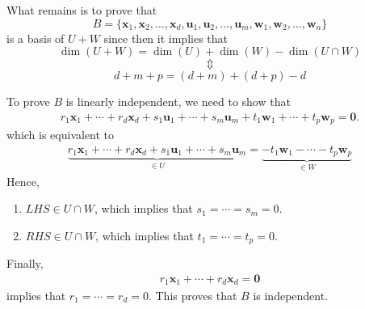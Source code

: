 \documentclass[pdf,9pt]{beamer}
\begin{document}
\begin{frame}[fragile]
    \begin{proofnoend}[continued]
	What remains is to prove that
	\[ B=\{ \bm{x}_1, \bm{x}_2, \ldots, \bm{x}_d,
		\bm{u}_1, \bm{u}_2, \ldots, \bm{u}_m,
	\bm{w}_1, \bm{w}_2, \ldots, \bm{w}_n \}\]
	is a basis of $U+W$ since then it implies that
	\[ \dim(U+W) = \dim(U) + \dim(W) -\dim(U\cap W)\]
	\[\Updownarrow\]
	\[ d+m+p = (d+m) + (d+p) - d \]
\end{proofnoend}
\end{frame}
\begin{frame}[fragile]
    \begin{proofnoend}[continued]
	To prove $B$ is linearly independent, we need to show that
	\begin{align*}
	    r_1 \bm{x}_1 + \cdots + r_d\bm{x}_d +
	    s_1 \bm{u}_1 + \cdots + s_m\bm{u}_m +
	    t_1 \bm{w}_1 + \cdots + t_p\bm{w}_p  = \bm{0}.
	\end{align*}
	which is equivalent to
	\begin{align*}
	    \underbrace{r_1 \bm{x}_1 + \cdots + r_d\bm{x}_d +
	    s_1 \bm{u}_1 + \cdots + s_m\bm{u}_m }_{\in U} =
	    \underbrace{- t_1 \bm{w}_1 - \cdots - t_p\bm{w}_p}_{\in W}
	\end{align*}
	Hence,
	\begin{enumerate}
	    \item $LHS\in  U\cap W$, which implies that $s_1=\cdots = s_m=0$.
	    \item $RHS\in  U\cap W$, which implies that $t_1=\cdots = t_p=0$.
	\end{enumerate}
	Finally,
	\begin{align*}
	    r_1 \bm{x}_1 + \cdots + r_d\bm{x}_d =\bm{0}
	\end{align*}
	implies that $r_1=\cdots =r_d=0$.
	This proves that $B$ is independent.
	\myQED
\end{proofnoend}
\end{frame}
\end{document}
